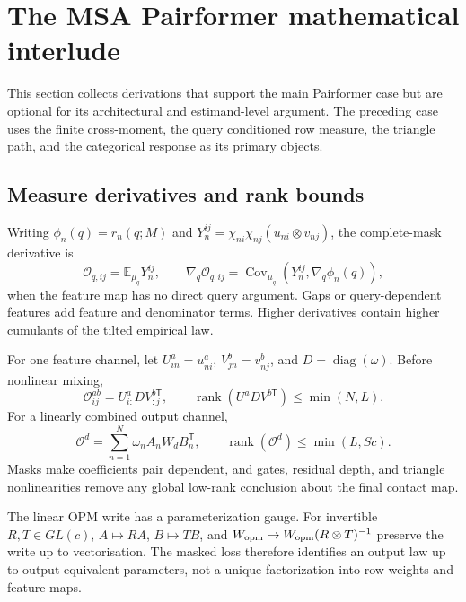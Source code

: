 \section{The MSA Pairformer mathematical interlude}
\label{sec:book-msa-pairformer-math}

This section collects derivations that support the main Pairformer case but are optional for its
architectural and estimand-level argument.  The preceding case uses the finite cross-moment, the query
conditioned row measure, the triangle path, and the categorical response as its primary objects.

\subsection{Measure derivatives and rank bounds}

Writing $\phi_n(q)=r_n(q;M)$ and
$Y_n^{ij}=\chi_{ni}\chi_{nj}(u_{ni}\otimes v_{nj})$, the complete-mask derivative is
\begin{equation}
\mathcal O_{q,ij}=\mathbb E_{\mu_q}Y_n^{ij},\qquad
\nabla_q\mathcal O_{q,ij}
=\operatorname{Cov}_{\mu_q}\!\left(Y_n^{ij},\nabla_q\phi_n(q)\right),
\label{eq:msa-pairformer-query-covariance-gradient}
\end{equation}
when the feature map has no direct query argument.  Gaps or query-dependent features add feature
and denominator terms.  Higher derivatives contain higher cumulants of the tilted empirical law.

For one feature channel, let $U^a_{in}=u^a_{ni}$, $V^b_{jn}=v^b_{nj}$, and
$D=\operatorname{diag}(\omega)$.  Before nonlinear mixing,
\begin{equation}
\mathcal O_{ij}^{ab}=U^a_{i:}DV^{b\mathsf T}_{:j},
\qquad
\operatorname{rank}(U^aDV^{b\mathsf T})\leq\min(N,L).
\label{eq:msa-pairformer-cross-moment-rank}
\end{equation}
For a linearly combined output channel,
\begin{equation}
\mathcal O^d=\sum_{n=1}^{N}\omega_nA_nW_dB_n^{\mathsf T},
\qquad
\operatorname{rank}(\mathcal O^d)\leq\min(L,Sc).
\label{eq:msa-pairformer-output-channel-rank}
\end{equation}
Masks make coefficients pair dependent, and gates, residual depth, and triangle nonlinearities remove
any global low-rank conclusion about the final contact map.

The linear OPM write has a parameterization gauge.  For invertible $R,T\in GL(c)$,
$A\mapsto RA$, $B\mapsto TB$, and
$W_{\rm opm}\mapsto W_{\rm opm}(R\otimes T)^{-1}$ preserve the write up to vectorisation.
The masked loss therefore identifies an output law up to output-equivalent parameters, not a unique
factorization into row weights and feature maps.


